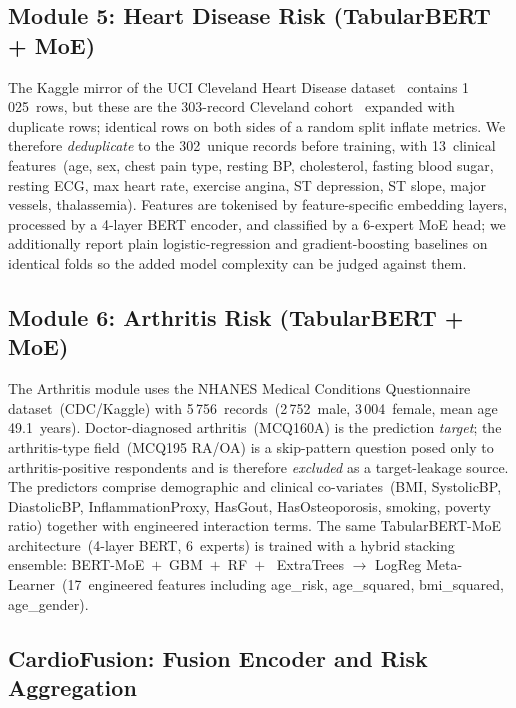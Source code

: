 \documentclass[AMA,STIX1COL,]{WileyNJD-v2}
\begin{document}
\subsection{Module 5: Heart Disease Risk (TabularBERT + MoE)}

The Kaggle mirror of the UCI Cleveland Heart Disease
dataset~\cite{shah2020} contains 1\,025~rows, but these are the
303-record Cleveland cohort~\cite{detrano1989} expanded with duplicate
rows; identical rows on both sides of a random split inflate metrics.
We therefore \emph{deduplicate} to the 302~unique records before
training, with 13~clinical features~(age, sex, chest pain type,
resting BP, cholesterol, fasting blood sugar, resting ECG, max heart
rate, exercise angina, ST depression, ST slope, major vessels,
thalassemia). Features are tokenised by feature-specific embedding
layers, processed by a 4-layer BERT encoder, and classified by a
6-expert MoE head; we additionally report plain logistic-regression and
gradient-boosting baselines on identical folds so the added model
complexity can be judged against them.

\subsection{Module 6: Arthritis Risk (TabularBERT + MoE)}

The Arthritis module uses the NHANES Medical Conditions Questionnaire
dataset~(CDC/Kaggle) with 5\,756~records~(2\,752~male, 3\,004~female,
mean age 49.1~years). Doctor-diagnosed arthritis~(MCQ160A) is the
prediction \emph{target}; the arthritis-type field~(MCQ195 RA/OA) is a
skip-pattern question posed only to arthritis-positive respondents and
is therefore \emph{excluded} as a target-leakage source. The
predictors comprise demographic and clinical co-variates~(BMI,
SystolicBP, DiastolicBP, InflammationProxy, HasGout, HasOsteoporosis,
smoking, poverty ratio) together with engineered interaction terms.
The same TabularBERT-MoE architecture~(4-layer BERT, 6~experts) is
trained with a hybrid stacking ensemble: BERT-MoE~$+$~GBM~$+$~RF~$+$~%
ExtraTrees $\rightarrow$ LogReg Meta-Learner~(17~engineered
features including age\_risk, age\_squared, bmi\_squared, age\_gender).

\subsection{CardioFusion: Fusion Encoder and Risk Aggregation}
\end{document}
